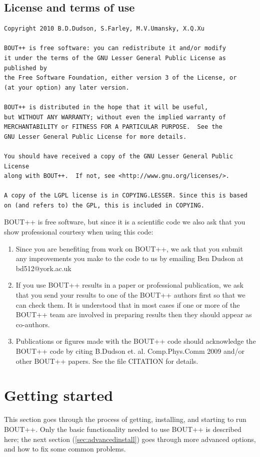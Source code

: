\documentclass[12pt]{article}
\begin{document}
\subsection{License and terms of use}
%
\begin{verbatim}
Copyright 2010 B.D.Dudson, S.Farley, M.V.Umansky, X.Q.Xu

BOUT++ is free software: you can redistribute it and/or modify
it under the terms of the GNU Lesser General Public License as published by
the Free Software Foundation, either version 3 of the License, or
(at your option) any later version.

BOUT++ is distributed in the hope that it will be useful,
but WITHOUT ANY WARRANTY; without even the implied warranty of
MERCHANTABILITY or FITNESS FOR A PARTICULAR PURPOSE.  See the
GNU Lesser General Public License for more details.

You should have received a copy of the GNU Lesser General Public License
along with BOUT++.  If not, see <http://www.gnu.org/licenses/>.

A copy of the LGPL license is in COPYING.LESSER. Since this is based
on (and refers to) the GPL, this is included in COPYING.
\end{verbatim}
%
BOUT++ is free software, but since it is a scientific code we also ask that you
show professional courtesy when using this code:

%
\begin{enumerate}
\item Since you are benefiting from work on BOUT++, we ask that you submit any
    improvements you make to the code to us by emailing Ben Dudson at
    bd512@york.ac.uk
\item If you use BOUT++ results in a paper or professional publication,
  we ask that you send your results to one of the BOUT++ authors first so that
  we can check them. It is understood that in most cases if one or more of the
  BOUT++ team are involved in preparing results then they should appear as
  co-authors.
\item Publications or figures made with the BOUT++ code should acknowledge the
  BOUT++ code by citing B.Dudson et. al. Comp.Phys.Comm 2009 \cite{Dudson2009}
  and/or other BOUT++ papers. See the file CITATION for details.
\end{enumerate}
%





\section{Getting started}
%
\label{sec:install}
%
This section goes through the process of getting, installing, and starting to
run BOUT++. Only the basic functionality needed to use BOUT++ is described
here; the next section (\ref{sec:advancedinstall}) goes through more advanced
options, and how to fix some common problems.
\end{document}
